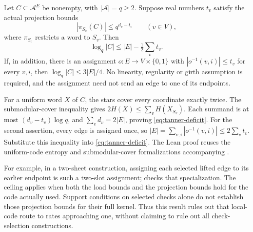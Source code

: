 \begin{proposition}\label{prop:tanner-barrier}
Let $C\subseteq\mathcal A^E$ be nonempty, with $|\mathcal A|=q\ge2$.
Suppose real numbers $t_v$ satisfy the actual projection bounds
\[
 |\pi_{S_v}(C)|\le q^{d_v-t_v}\qquad(v\in V),
\]
where $\pi_{S_v}$ restricts a word to $S_v$. Then
\begin{equation}\label{eq:tanner-deficit}
 \log_q|C|\le |E|-\tfrac12\sum_v t_v.
\end{equation}
If, in addition, there is an assignment
$o:E\to V\times\{0,1\}$ with
$|o^{-1}(v,i)|\le t_v$ for every $v,i$, then
$\log_q|C|\le3|E|/4$.
No linearity, regularity or girth assumption is required, and the
assignment need not send an edge to one of its endpoints.
\end{proposition}
\begin{outline}
For a uniform word $X$ of $C$, the stars cover every coordinate
exactly twice. The submodular-cover inequality gives
$2H(X)\le\sum_v H(X_{S_v})$.
Each summand is at most $(d_v-t_v)\log q$, and
$\sum_vd_v=2|E|$, proving \cref{eq:tanner-deficit}.
For the second assertion, every edge is assigned once, so
$|E|=\sum_{v,i}|o^{-1}(v,i)|\le2\sum_vt_v$. Substitute this
inequality into \cref{eq:tanner-deficit}. The Lean proof reuses the
uniform-code entropy and submodular-cover formalizations accompanying
\cite{PaperTwo}.
\end{outline}

For example, in a two-sheet construction, assigning each selected
lifted edge to its earlier endpoint is such a two-slot assignment;
 checks
that specialization. The ceiling applies when both the load bounds
and the projection bounds hold for the code actually used. Support
conditions on selected checks alone do not establish those projection
bounds for their full kernel. Thus this result rules out that local-code
route to rates approaching one, without claiming to rule out all
check-selection constructions.

